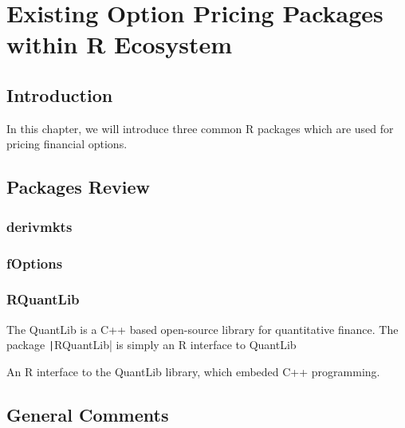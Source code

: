 \chapter{Existing Option Pricing Packages within R Ecosystem} \label{cpt:Existing Packages}

\section{Introduction}

In this chapter, we will introduce three common R packages which are used for pricing financial options.

\section{Packages Review}

\subsection{derivmkts} \label{sub:derivmkts}



\subsection{fOptions} \label{sub:fOptions}



\subsection{RQuantLib} \label{sub:RQuantLib}

The QuantLib is a C++ based open-source library for quantitative finance. The package \texttt|RQuantLib| is simply an R interface to QuantLib


An R interface to the QuantLib library, which embeded C++ programming.

\section{General Comments}

\newpage